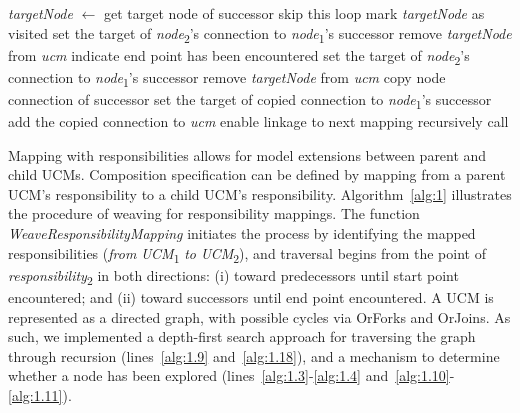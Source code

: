 \begin{algorithm}                     
	\begin{algorithmic}[1]
		
				\State \emph{targetNode} $\gets$ get target node of successor
				 \label{alg:1.10}
					\State skip this loop
					\State mark \emph{targetNode} as visited
				\EndIf \label{alg:1.11}
				 \label{alg:1.12}
						\State set the target of \emph{node}\textsubscript{2}'s connection to \emph{node}\textsubscript{1}'s successor
						\State remove \emph{targetNode} from \emph{ucm}
						\State indicate end point has been encountered
					\EndIf \label{alg:1.13}
				 \label{alg:1.14}
					\State set the target of \emph{node}\textsubscript{2}'s connection to \emph{node}\textsubscript{1}'s successor
						\State remove \emph{targetNode} from \emph{ucm}
					\EndIf \label{alg:1.15}
				 \label{alg:1.16}
					\State copy node connection of successor
					\State set the target of copied connection to \emph{node}\textsubscript{1}'s successor
					\State add the copied connection to \emph{ucm}
					\State enable linkage to next mapping \label{alg:1.17}
				\Else
					\State recursively call  \label{alg:1.18}
				\EndIf
			\EndFor
		\EndFunction
	\end{algorithmic}
\end{algorithm}

 Mapping with responsibilities allows for model extensions between parent and child UCMs. Composition specification can be defined by mapping from a parent UCM's responsibility to a child UCM's responsibility. Algorithm~\ref{alg:1} illustrates the procedure of weaving for responsibility mappings. The function \emph{WeaveResponsibilityMapping} initiates the process by identifying the mapped responsibilities (\emph{from} \emph{UCM}\textsubscript{1} \emph{to} \emph{UCM}\textsubscript{2}), and traversal begins from the point of \emph{responsibility}\textsubscript{2} in both directions: (i) toward predecessors until start point encountered; and (ii) toward successors until end point encountered. A UCM is represented as a directed graph, with possible cycles via {\cls OrFork}s and {\cls OrJoin}s. As such, we implemented a depth-first search approach for traversing the graph through recursion (lines~\ref{alg:1.9} and~\ref{alg:1.18}), and a mechanism to determine whether a node has been explored (lines~\ref{alg:1.3}-\ref{alg:1.4} and~\ref{alg:1.10}-\ref{alg:1.11}).

